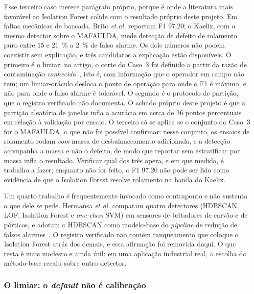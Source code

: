\documentclass[11pt,a4paper]{article}
\begin{document}
Esse terceiro caso merece parágrafo próprio, porque é onde a literatura mais favorável ao
Isolation Forest colide com o resultado próprio deste projeto. Em faltas mecânicas de
bancada, Brito \emph{et al.} reportam F1 \num{97,20}; o Kaelix, com o mesmo detector
sobre o MAFAULDA, mede detecção de defeito de rolamento puro entre \num{15} e
\SI{21}{\percent} a \SI{2}{\percent} de falso alarme. Os dois números não podem coexistir
sem explicação, e três candidatos a explicação estão disponíveis. O primeiro é o limiar:
no artigo, o corte do Caso~3 foi definido a partir da razão de contaminação
\emph{conhecida}~\cite{brito2022}, isto é, com informação que o operador em campo não
tem; um limiar-oráculo desloca o ponto de operação para onde o F1 é máximo, e não para
onde o falso alarme é tolerável. O segundo é o protocolo de partição, que o registro
verificado não documenta. O achado próprio deste projeto é que a partição aleatória de
janelas infla a acurácia em cerca de 36 pontos percentuais em relação à validação por
ensaio. O terceiro só se aplica se o conjunto do Caso~3 for o MAFAULDA, o que não foi
possível confirmar: nesse conjunto, os ensaios de rolamento rodam \emph{com} massa de
desbalanceamento adicionada, e a detecção acompanha a massa e não o defeito, de modo que
reportar sem estratificar por massa infla o resultado. Verificar qual dos três opera, e em
que medida, é trabalho a fazer; enquanto não for feito, o F1 \num{97,20} não pode ser lido
como evidência de que o Isolation Forest resolve rolamento na banda do Kaelix.

Um quarto trabalho é frequentemente invocado como contraponto e não sustenta o que dele
se pede. Hermansa \emph{et al.} comparam quatro detectores (HDBSCAN, LOF, Isolation
Forest e \emph{one-class} SVM) em sensores de britadores de carvão e de pórticos, e
adotam o HDBSCAN como modelo-base do \emph{pipeline} de redução de falsos
alarmes~\cite{hermansa2022}. O registro verificado não contém ranqueamento que coloque o
Isolation Forest atrás dos demais, e essa afirmação foi removida daqui. O que resta é
mais modesto e ainda útil: em uma aplicação industrial real, a escolha do método-base
recaiu sobre outro detector.

\subsubsection{O limiar: o \emph{default} não é calibração}
\end{document}
